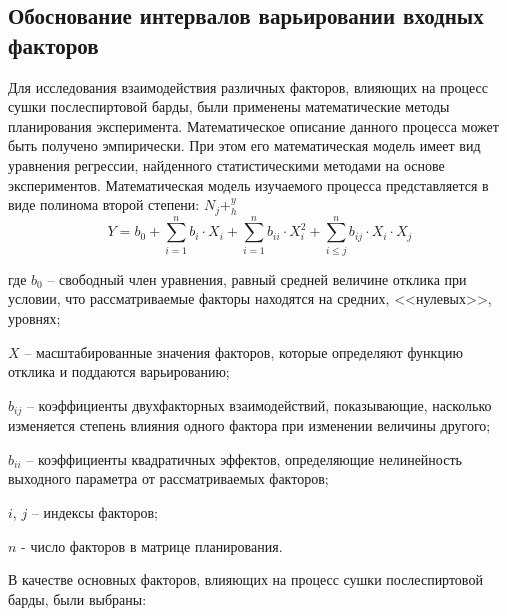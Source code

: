 \subsection{Обоснование интервалов варьировании входных факторов}
Для исследования взаимодействия различных факторов, влияющих на процесс сушки послеспиртовой
барды, были применены
математические методы планирования эксперимента.
Математическое описание данного процесса может быть получено эмпирически. При этом его
математическая модель имеет вид уравнения регрессии, найденного статистическими методами на
основе экспериментов. Математическая модель изучаемого процесса представляется в виде
полинома второй степени: \(N_{j}+^{y}_{h}
\)
\begin{equation}
Y=b_{0}+\sum\limits_{i=1}^{n}b_i\cdot X_i
+\sum\limits_{i=1}^{n}b_{ii}\cdot X_{i}^2
+\sum\limits_{i\leq j}^{n}b_{ij}\cdot X_i\cdot X_j
\end{equation}

\begin{description}
\item где $b_{0}$ -- свободный член уравнения, равный средней величине отклика при
    условии,
    что рассматриваемые факторы находятся на средних, <<нулевых>>, уровнях;
\item $X$ -- масштабированные значения факторов, которые определяют функцию отклика и
    поддаются варьированию;
\item $b_{ij}$ -- коэффициенты двухфакторных взаимодействий, показывающие, насколько
    изменяется степень влияния одного фактора при изменении величины другого;
\item $b_{ii}$ -- коэффициенты  квадратичных эффектов, определяющие нелинейность выходного
    параметра от рассматриваемых факторов;
\item $i$, $j$ -- индексы факторов;
\item $n$ - число факторов в матрице планирования.
\end{description}

В качестве основных факторов, влияющих на процесс сушки послеспиртовой барды, были выбраны:

